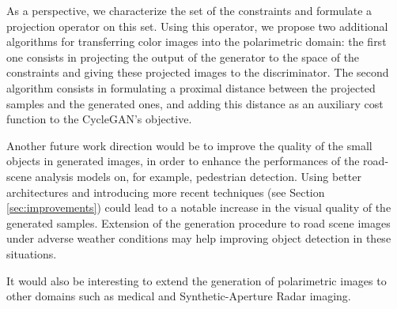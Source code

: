 As a perspective, we characterize the set of the constraints and formulate a projection operator on this set. Using this operator, we propose two additional algorithms for transferring color images into the polarimetric domain: the first one consists in projecting the output of the generator to the space of the constraints and giving these projected images to the discriminator. The second algorithm consists in formulating a proximal distance between the projected samples and the generated ones, and adding this distance as an auxiliary cost function to the CycleGAN's objective.

Another future work  direction would  be to improve the quality of the small objects in generated images, in order to enhance the performances of the road-scene analysis models on, for example, pedestrian detection. Using better architectures and introducing more recent techniques (see Section \ref{sec:improvements}) could lead to a notable increase in the visual quality of the generated samples. Extension of the generation procedure to road scene images under adverse weather conditions may help improving object detection in these situations. 

It would also be interesting to extend the generation of polarimetric images to other domains such as medical and Synthetic-Aperture Radar \citep{vanZyl2011} imaging.
